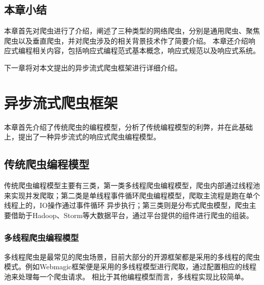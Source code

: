 \documentclass[master]{njuthesis}
\begin{document}




\section{本章小结}
本章首先对爬虫进行了介绍，阐述了三种类型的网络爬虫，分别是通用爬虫、聚焦爬虫以及垂直爬虫，并对爬虫涉及的相关背景技术作了简要介绍。
本章还介绍响应式编程相关内容，包括响应式编程范式基本概念，响应式规范以及响应式系统。

下一章将对本文提出的异步流式爬虫框架进行详细介绍。

\chapter{异步流式爬虫框架}\label{Chapter_reflect}
本章首先介绍了传统爬虫的编程模型，分析了传统编程模型的利弊，并在此基础上，提出了一种异步流式的响应式爬虫编程模型。


\section{传统爬虫编程模型}
传统爬虫编程模型主要有三类，第一类多线程爬虫编程模型，爬虫内部通过线程池来实现并发爬取；第二类是单线程事件循环爬虫编程模型，爬取主流程是跑在单个线程上的，IO操作通过事件循环
异步执行；第三类则是分布式爬虫模型\cite{boldi2004ubicrawler}，爬虫主要借助于Hadoop、Storm等大数据平台，通过平台提供的组件进行爬虫的组装。

\subsection{多线程爬虫编程模型}
多线程爬虫是最常见的爬虫场景，目前大部分的开源框架都是采用的多线程的爬虫模式。例如Webmagic框架便是采用的多线程模型进行爬取，通过配置相应的线程池来处理每一个爬虫请求。
相比于其他编程模型而言，多线程实现比较简单。
\end{document}
